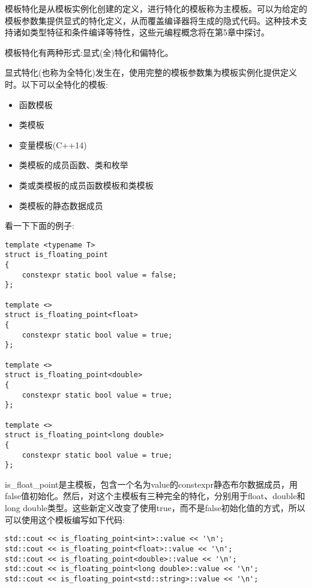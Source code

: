
模板特化是从模板实例化创建的定义，进行特化的模板称为主模板。可以为给定的模板参数集提供显式的特化定义，从而覆盖编译器将生成的隐式代码。这种技术支持诸如类型特征和条件编译等特性，这些元编程概念将在第5章中探讨。

模板特化有两种形式:显式(全)特化和偏特化。


显式特化(也称为全特化)发生在，使用完整的模板参数集为模板实例化提供定义时。以下可以全特化的模板:

\begin{itemize}
\item 
函数模板

\item 
类模板

\item 
变量模板(C++14)

\item 
类模板的成员函数、类和枚举

\item 
类或类模板的成员函数模板和类模板

\item 
类模板的静态数据成员
\end{itemize}

看一下下面的例子:

\begin{lstlisting}[style=styleCXX]
template <typename T>
struct is_floating_point
{
	constexpr static bool value = false;
};

template <>
struct is_floating_point<float>
{
	constexpr static bool value = true;
};

template <>
struct is_floating_point<double>
{
	constexpr static bool value = true;
};

template <>
struct is_floating_point<long double>
{
	constexpr static bool value = true;
};
\end{lstlisting}

is\_float\_point是主模板，包含一个名为value的constexpr静态布尔数据成员，用false值初始化。然后，对这个主模板有三种完全的特化，分别用于float、double和long double类型。这些新定义改变了使用true，而不是false初始化值的方式，所以可以使用这个模板编写如下代码:

\begin{lstlisting}[style=styleCXX]
std::cout << is_floating_point<int>::value << '\n';
std::cout << is_floating_point<float>::value << '\n';
std::cout << is_floating_point<double>::value << '\n';
std::cout << is_floating_point<long double>::value << '\n';
std::cout << is_floating_point<std::string>::value << '\n';
\end{lstlisting}

